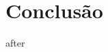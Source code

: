 \documentclass[
    12pt,
openright,             %
    twoside,               %
    a4paper,
french,            %
ngerman,           %
spanish,           %
brazil,            %
british,           %
    ]{abntex2}
\begin{document}
\lipsum[24]


\chapter{Conclusão}

\lipsum[31]

\postextual{}  %



{after}
\end{document}
